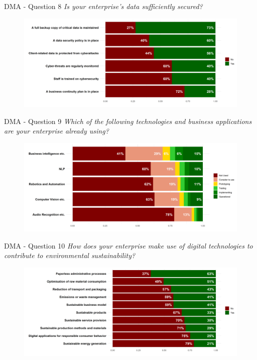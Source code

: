 \documentclass{beamer}
\begin{document}
    \begin{frame}{DMA - Question 8}
        \centering\textit{Is your enterprise’s data sufficiently secured?}
        \begin{figure}
            \centering
            \includegraphics[width=\textwidth]{../Output/q8.png}

        \end{figure}
    \end{frame}

    \begin{frame}{DMA - Question 9}
        \centering\textit{Which of the following technologies and business applications are your enterprise already
        using?}
        \begin{figure}
            \centering
            \includegraphics[width=\textwidth]{../Output/q9.png}

        \end{figure}
    \end{frame}

    \begin{frame}{DMA - Question 10}
        \centering\textit{How does your enterprise make use of digital technologies to contribute to environmental sustainability?}
        \begin{figure}
            \centering
            \includegraphics[width=\textwidth]{../Output/q10.png}

        \end{figure}
    \end{frame}
\end{document}
